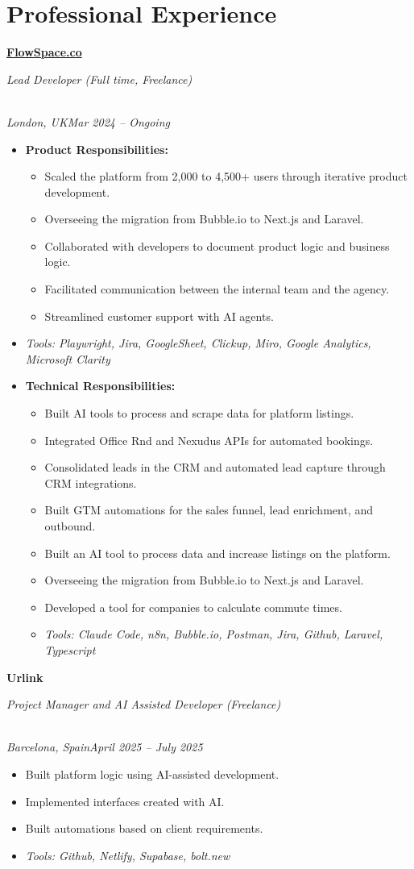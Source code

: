 \documentclass[a4paper,10pt]{article}
\newcommand{\role}[4]{\vspace{3pt}\noindent\hspace{0.6em}\parbox[t]{0.38\textwidth}{\raggedright\textbf{#1}}\hfill\parbox[t]{0.58\textwidth}{\raggedleft\textit{#2}}\\{\textit{#3}\hfill\textit{#4}}\vspace{1pt}}
\begin{document}
\section{Professional Experience}
\role{\href{https://flowspace.co}{FlowSpace.co}}{Lead Developer (Full time, Freelance)}{London, UK}{Mar 2024 -- Ongoing}
\begin{itemize}
\item \textbf{Product Responsibilities:}
\begin{itemize}[label=--]
\item Scaled the platform from 2,000 to 4,500+ users through iterative product development.
\item Overseeing the migration from Bubble.io to Next.js and Laravel.
\item Collaborated with developers to document product logic and business logic.
\item Facilitated communication between the internal team and the agency.
\item Streamlined customer support with AI agents.
\end{itemize}
\item \textit{Tools: Playwright, Jira, GoogleSheet, Clickup, Miro, Google Analytics, Microsoft Clarity}
\item \textbf{Technical Responsibilities:}
\begin{itemize}[label=--]
\item Built AI tools to process and scrape data for platform listings.
\item Integrated Office Rnd and Nexudus APIs for automated bookings.
\item Consolidated leads in the CRM and automated lead capture through CRM integrations.
\item Built GTM automations for the sales funnel, lead enrichment, and outbound.
\item Built an AI tool to process data and increase listings on the platform.
\item Overseeing the migration from Bubble.io to Next.js and Laravel.
\item Developed a tool for companies to calculate commute times.
\item \textit{Tools: Claude Code, n8n, Bubble.io, Postman, Jira, Github, Laravel, Typescript}
\end{itemize}
\end{itemize}

\role{Urlink}{Project Manager and AI Assisted Developer (Freelance)}{Barcelona, Spain}{April 2025 -- July 2025}
\begin{itemize}
\item Built platform logic using AI-assisted development.
\item Implemented interfaces created with AI.
\item Built automations based on client requirements.
\item \textit{Tools: Github, Netlify, Supabase, bolt.new}
\end{itemize}
\end{document}
